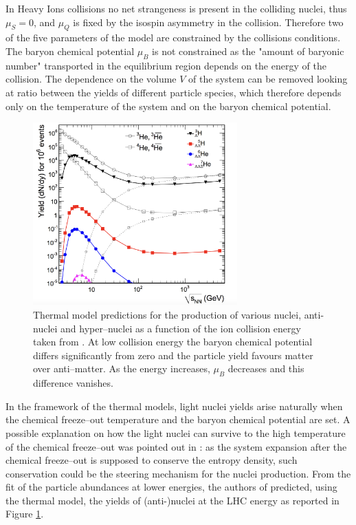 In Heavy Ions collisions no net strangeness is present in the colliding nuclei, thus 
$\mu_S = 0$, and $\mu_Q$ is fixed by the isospin asymmetry in the collision.
Therefore two of the five parameters of the model are constrained by the collisions
conditions.
The baryon chemical potential $\mu_B$ is not constrained as the "amount of baryonic number"
transported in the equilibrium region depends on the energy of the collision.
The dependence on the volume $V$ of the system can be removed looking at ratio between 
the yields of different particle species, which therefore depends only on the temperature 
of the system and on the baryon chemical potential.
\begin{figure} 
    \centering
    \includegraphics[width=0.7\textwidth]{gfx/yields}
    \caption{Thermal model predictions for the production of various nuclei, anti-nuclei and hyper–nuclei as a function of the ion collision energy taken from \cite{yields}. At low collision energy the baryon chemical potential differs significantly from zero and the particle yield favours matter over anti–matter. As the energy increases, $\mu_{B}$ decreases and this difference vanishes.
}
\label{fig:aliceyields}
\end{figure}
In the framework of the thermal models, light nuclei yields arise naturally when the chemical 
freeze–out temperature and the baryon chemical potential are set.
A possible explanation on how the light nuclei can survive to the high temperature of the chemical 
freeze–out was pointed out in \cite{yields}: as the system expansion after the chemical freeze–out
is supposed to conserve the entropy density, such conservation could be the steering mechanism for 
the nuclei production. From the fit of the particle abundances at lower energies, the 
authors of \cite{yields} predicted, using the thermal model, the yields of (anti-)nuclei 
at the LHC energy as reported in Figure \ref{fig:aliceyields}.

